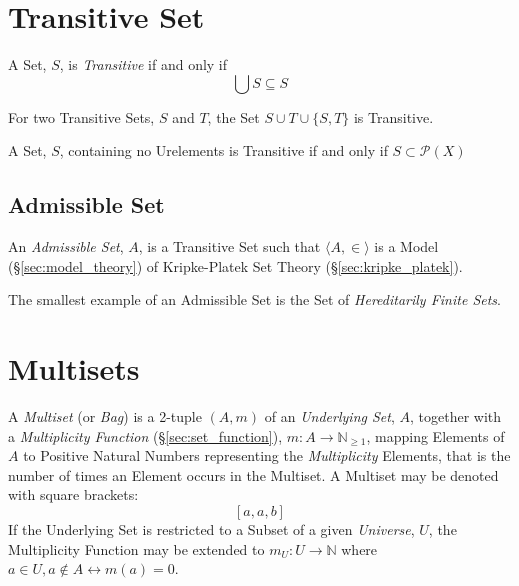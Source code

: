\section{Transitive Set}\label{sec:transitive_set}

A Set, $S$, is \emph{Transitive} if and only if
\[
    \bigcup S \subseteq S
\]

For two Transitive Sets, $S$ and $T$, the Set $S \cup T \cup \{S,T\}$
is Transitive.

A Set, $S$, containing no Urelements is Transitive if and only if $S
\subset \mathcal{P}(X)$



\subsection{Admissible Set}\label{sec:admissible_set}

An \emph{Admissible Set}, $A$, is a Transitive Set such that $\langle
A, \in \rangle$ is a Model (\S\ref{sec:model_theory}) of Kripke-Platek
Set Theory (\S\ref{sec:kripke_platek}).

The smallest example of an Admissible Set is the Set of
\emph{Hereditarily Finite Sets}. %



\section{Multisets}\label{sec:multi_sets}

A \emph{Multiset} (or \emph{Bag}) is a 2-tuple $(A,m)$ of an
\emph{Underlying Set}, $A$, together with a \emph{Multiplicity
  Function} (\S\ref{sec:set_function}), $m : A \rightarrow
\mathbb{N}_{\geq 1}$, mapping Elements of $A$ to Positive Natural
Numbers representing the \emph{Multiplicity} Elements, that is the
number of times an Element occurs in the Multiset. A Multiset may be
denoted with square brackets:
\[
    [a,a,b]
\]
If the Underlying Set is restricted to a Subset of a given
\emph{Universe}, $U$, the Multiplicity Function may be extended to
$m_U : U \rightarrow \mathbb{N}$ where $a \in U, a \notin A
\leftrightarrow m(a)=0$.

